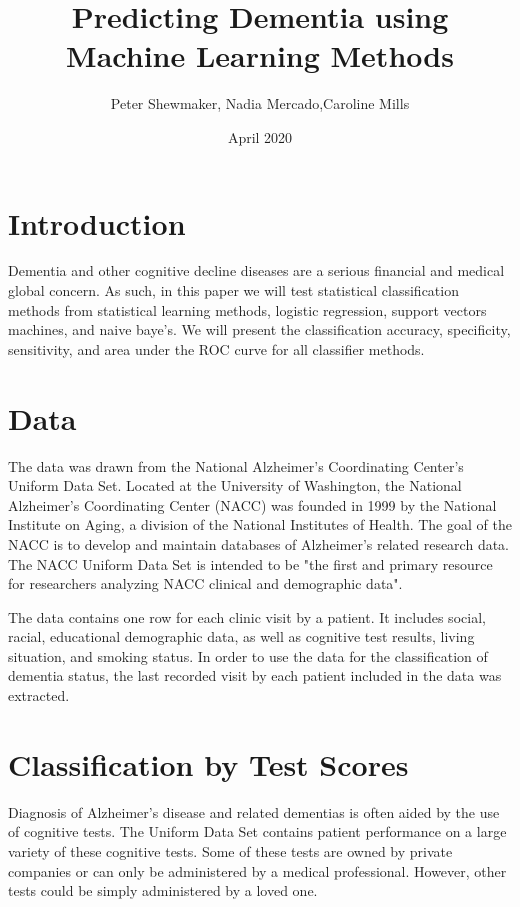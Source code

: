\documentclass[a4paper,man,natbib,11pt]{article}
\title{Predicting Dementia using Machine Learning Methods}
\author{Peter Shewmaker, Nadia Mercado,Caroline Mills  }
\date{April 2020}
\begin{document}
\maketitle

\section{Introduction}

Dementia and other cognitive decline diseases are a serious financial and medical global concern. As such, in this paper we will test statistical classification methods from statistical learning methods, logistic regression, support vectors machines, and naive baye's. We will present the classification accuracy, specificity, sensitivity, and area under the ROC curve for all classifier methods. 

\section{Data}

The data was drawn from the National Alzheimer's Coordinating Center's Uniform Data Set. Located at the University of Washington, the National Alzheimer's Coordinating Center (NACC) was founded in 1999 by the National Institute on Aging, a division of the National Institutes of Health. The goal of the NACC is to develop and maintain databases of Alzheimer's related research data. The NACC Uniform Data Set is intended to be "the first and primary resource for researchers analyzing NACC clinical and demographic data".

The data contains one row for each clinic visit by a patient. It includes social, racial, educational demographic data, as well as cognitive test results, living situation, and smoking status. In order to use the data for the classification of dementia status, the last recorded visit by each patient included in the data was extracted.

\section{Classification by Test Scores}

Diagnosis of Alzheimer's disease and related dementias is often aided by the use of cognitive tests. The Uniform Data Set contains patient performance on a large variety of these cognitive tests. Some of these tests are owned by private companies or can only be administered by a medical professional. However, other tests could be simply administered by a loved one. 
\end{document}
